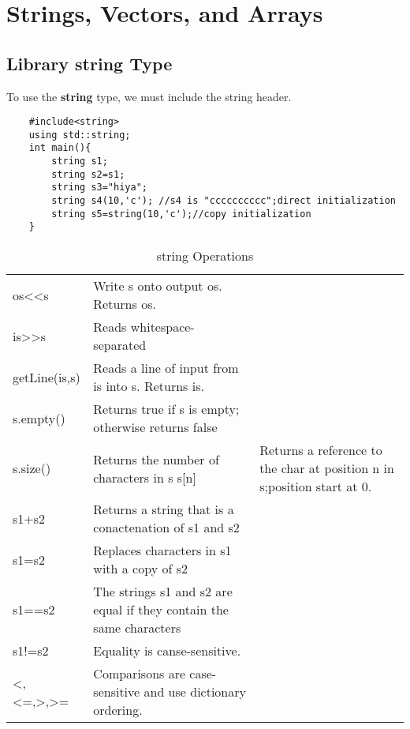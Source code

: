 \documentclass[UTF8]{ctexart}
\begin{document}
\section{Strings, Vectors, and Arrays}

\subsection{Library string Type}
To use the \textbf{string} type, we must include the string header.
\begin{lstlisting}
	#include<string>
	using std::string;
	int main(){
		string s1;
		string s2=s1;
		string s3="hiya";
		string s4(10,'c'); //s4 is "cccccccccc";direct initialization
		string s5=string(10,'c');//copy initialization
	}
\end{lstlisting}

\begin{table}[H]
	\centering
	\begin{tabular}{|l|l|}
		\hline
		os<<s           & Write s onto output os. Returns os.                                       \\
		is>>s           & Reads whitespace-separated                                                \\
		getLine(is,s)   & Reads a line of input from is into s. Returns is.                         \\
		s.empty()       & Returns true if s is empty; otherwise returns false                       \\
		s.size()		& Returns the number of characters in s
		s[n]            & Returns a reference to the char at position n in s;position start at 0.   \\
		s1+s2           & Returns a string that is a conactenation of s1 and s2                     \\
		s1=s2           & Replaces characters in s1 with a copy of s2                               \\
		s1==s2          & The strings s1 and s2 are equal if they contain the same characters       \\
		s1!=s2          & Equality is canse-sensitive.                                              \\
		<,<=,>,>=       & Comparisons are case-sensitive and use dictionary ordering.               \\
		\hline
	\end{tabular}
	\caption*{string Operations}
\end{table}%
\end{document}
